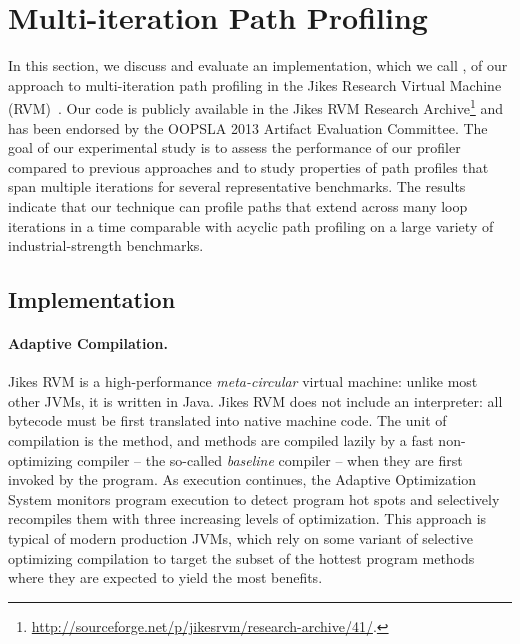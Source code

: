 
\section{Multi-iteration Path Profiling}
\label{ss:kblpp-eval}

In this section, we discuss and evaluate an implementation, which we call \kblpp, of our approach to multi-iteration path profiling in the Jikes Research Virtual Machine (RVM)~\cite{Alpern00}. Our code is publicly available in the Jikes RVM Research Archive\footnote{\url{http://sourceforge.net/p/jikesrvm/research-archive/41/}.} and has been endorsed by the OOPSLA 2013 Artifact Evaluation Committee. The goal of our experimental study is to assess the performance of our profiler compared to previous approaches and to study properties of path profiles that span multiple iterations for several representative benchmarks. The results indicate that our technique can profile paths that extend across many loop iterations in a time comparable with acyclic path profiling on a large variety of industrial-strength benchmarks.

\subsection{Implementation}
\label{ss:kblpp-implementation}

\paragraph*{Adaptive Compilation.}  Jikes RVM is a high-performance {\em meta-circular} virtual machine: unlike most other JVMs, it is written in Java. Jikes RVM does not include an interpreter: all bytecode must be first translated into native machine code. The unit of compilation is the method, and methods are compiled lazily by a fast non-optimizing compiler -- the so-called {\em baseline} compiler -- when they are first invoked by the program. As execution continues, the Adaptive Optimization System monitors program execution to detect program hot spots and selectively recompiles them with three increasing levels of optimization. This approach is typical of modern production JVMs, which rely on some variant of selective optimizing compilation to target the subset of the hottest program methods where they are expected to yield the most benefits.

